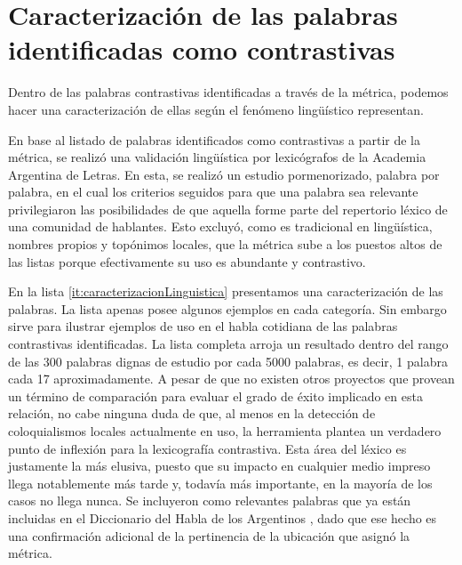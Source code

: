 
\section{Caracterización de las palabras identificadas como contrastivas}
\label{caracterizacion_resultados}

Dentro de las palabras contrastivas identificadas a través de la métrica, podemos hacer una caracterización de ellas según el fenómeno lingüístico representan.


En base al listado de palabras identificados como contrastivas a partir de la métrica, se realizó una validación lingüística por lexicógrafos de la Academia Argentina de Letras. En esta, se realizó un estudio pormenorizado, palabra por palabra, en el cual los criterios seguidos para que una palabra sea relevante privilegiaron las posibilidades de que aquella forme parte del repertorio léxico de una comunidad de hablantes. Esto excluyó, como es tradicional en lingüística, nombres propios y topónimos locales, que la métrica sube a los puestos altos de las listas porque efectivamente su uso es abundante y contrastivo. 

En la lista \ref{it:caracterizacionLinguistica} presentamos una caracterización de las palabras. La lista apenas posee algunos ejemplos en cada categoría. Sin embargo sirve para ilustrar ejemplos de uso en el habla cotidiana de las palabras contrastivas identificadas. La lista completa arroja un resultado dentro del rango de las 300 palabras dignas de estudio por cada 5000 palabras, es decir, 1 palabra cada 17 aproximadamente. A pesar de que no existen otros proyectos que provean un término de comparación para evaluar el grado de éxito implicado en esta relación, no cabe ninguna duda de que, al menos en la detección de coloquialismos locales actualmente en uso, la herramienta plantea un verdadero punto de inflexión para la lexicografía contrastiva. Esta área del léxico es justamente la más elusiva, puesto que su impacto en cualquier medio impreso llega notablemente más tarde y, todavía más importante, en la mayoría de los casos no llega nunca. Se incluyeron como relevantes palabras que ya están incluidas en el Diccionario del Habla de los Argentinos \cite{academia2008diccionario}, dado que ese hecho es una confirmación adicional de la pertinencia de la ubicación que asignó la métrica.

